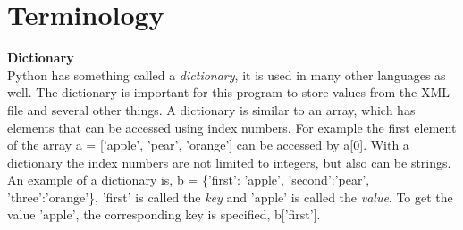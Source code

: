 \section*{Terminology}

\textbf{Dictionary}\\
Python has something called a \textit{dictionary}, it is used in many other languages as well.
The dictionary is important for this program to store values from the XML file and several other things.
A dictionary is similar to an array, which has elements that can be accessed using index numbers.
For example the first element of the array a = ['apple', 'pear', 'orange'] can be accessed by a[0].
With a dictionary the index numbers are not limited to integers, but also can be strings.
An example of a dictionary is, b = \{'first': 'apple', 'second':'pear', 'three':'orange'\}, 'first' is called the \textit{key} and 'apple' is called the \textit{value}. To get the value 'apple', the corresponding key is specified, b['first'].
